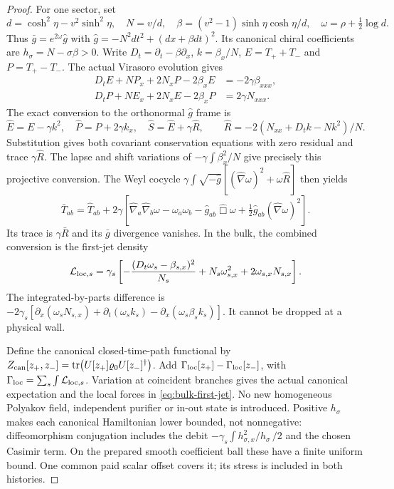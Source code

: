 \documentclass[12pt,a4paper]{article}
\begin{document}
\begin{proof}
For one sector, set
\begin{equation}
 d=\cosh^2\eta-v^2\sinh^2\eta,\quad
 N=v/d,\quad \beta=(v^2-1)\sinh\eta\cosh\eta/d,\quad
 \omega=\rho+\tfrac12\log d.                               \label{eq:bulk-optical-ADM}
\end{equation}
Thus $\bar g=e^{2\omega}\hat g$ with
$\hat g=-N^2dt^2+(dx+\beta dt)^2$. Its canonical chiral coefficients
are $h_\sigma=N-\sigma\beta>0$. Write $D_t=\partial_t-\beta\partial_x$,
$k=\beta_x/N$, $E=T_++T_-$ and $P=T_+-T_-$. The actual Virasoro
evolution gives
\begin{align}
 D_tE+NP_x+2N_xP-2\beta_xE&=-2\gamma\beta_{xxx},\\
 D_tP+NE_x+2N_xE-2\beta_xP&= 2\gamma N_{xxx}.               \label{eq:bulk-canonical-Ward}
\end{align}
The exact conversion to the orthonormal $\hat g$ frame is
\begin{equation}
 \hat E=E-\gamma k^2,\quad \hat P=P+2\gamma k_x,\quad
 \hat S=\hat E+\gamma\hat R,\qquad
 \hat R=-2(N_{xx}+D_tk-Nk^2)/N.                           \label{eq:bulk-projective-conversion}
\end{equation}
Substitution gives both covariant conservation equations with zero
residual and trace $\gamma\hat R$. The lapse and shift variations of
$-\gamma\int\beta_x^2/N$ give precisely this projective conversion.
The Weyl cocycle $\gamma\int\sqrt{-\hat g}[(\hat\nabla\omega)^2+
\omega\hat R]$ then yields
\begin{equation}
 \bar T_{ab}=\hat T_{ab}+2\gamma\left[
 \hat\nabla_a\hat\nabla_b\omega-\omega_a\omega_b
 -\hat g_{ab}\hat\Box\omega+
 \tfrac12\hat g_{ab}(\hat\nabla\omega)^2\right].           \label{eq:bulk-Weyl-conversion}
\end{equation}
Its trace is $\gamma\bar R$ and its $\bar g$ divergence vanishes.
In the bulk, the combined conversion is the first-jet density
\begin{equation}
 \mathcal L_{{\rm loc},s}=\gamma_s\left[
 -\frac{(D_t\omega_s-\beta_{s,x})^2}{N_s}
 +N_s\omega_{s,x}^2+2\omega_{s,x}N_{s,x}\right].            \label{eq:bulk-first-jet}
\end{equation}
The integrated-by-parts difference is
$-2\gamma_s[\partial_x(\omega_sN_{s,x})+
\partial_t(\omega_sk_s)-\partial_x(\omega_s\beta_sk_s)]$.
It cannot be dropped at a physical wall.

Define the canonical closed-time-path functional by
$Z_{\rm can}[z_+,z_-]=\tr(U[z_+]\varrho_0U[z_-]^\dagger)$.
Add $\Gamma_{\rm loc}[z_+]-\Gamma_{\rm loc}[z_-]$, with
$\Gamma_{\rm loc}=\sum_s\int\mathcal L_{{\rm loc},s}$.
Variation at coincident branches gives the actual canonical expectation
and the local forces in \eqref{eq:bulk-first-jet}. No new homogeneous
Polyakov field, independent purifier or in-out state is introduced.
Positive $h_\sigma$ makes each canonical Hamiltonian lower bounded,
not nonnegative: diffeomorphism conjugation includes the debit
$-\gamma_s\int h_{\sigma,x}^2/h_\sigma\,/2$ and the chosen Casimir term.
On the prepared smooth coefficient ball these have a finite uniform
bound. One common paid scalar offset covers it; its stress is included
in both histories.


\end{proof}
\end{document}
